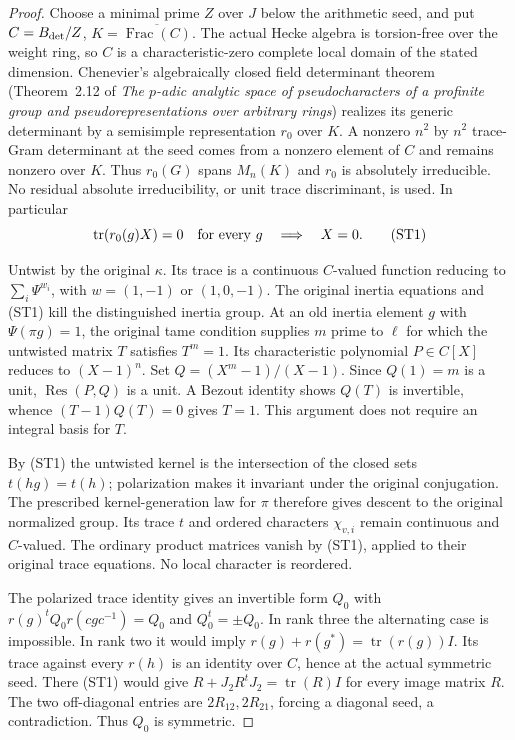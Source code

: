 \begin{proof}
Choose a minimal prime $Z$ over $J$ below the arithmetic seed, and put
$C=B_{\rm det}/Z$, $K=\overline{\operatorname{Frac}(C)}$. The actual
Hecke algebra is torsion-free over the weight ring, so $C$ is a
characteristic-zero complete local domain of the stated dimension.
Chenevier's algebraically closed field determinant theorem
(Theorem~2.12 of \emph{The $p$-adic analytic space of pseudocharacters
of a profinite group and pseudorepresentations over arbitrary rings})
realizes its generic determinant by a semisimple representation $r_0$
over $K$.\cite{support-chenevier}
A nonzero $n^2$ by $n^2$ trace-Gram determinant at the seed
comes from a nonzero element of $C$ and remains nonzero over $K$.
Thus $r_0(G)$ spans $M_n(K)$ and $r_0$ is absolutely irreducible.
No residual absolute irreducibility, or unit trace discriminant, is used.
In particular
\[
 \operatorname{tr}(r_0(g)X)=0\quad\hbox{for every }g
 \quad\Longrightarrow\quad X=0.                 \tag{ST1}
\]

Untwist by the original $\kappa$. Its trace is a continuous $C$-valued
function reducing to $\sum_i\Psi^{w_i}$, with
$w=(1,-1)$ or $(1,0,-1)$. The original inertia equations and (ST1)
kill the distinguished inertia group. At an old inertia element
$g$ with $\Psi(\pi g)=1$, the original tame condition supplies
$m$ prime to $\ell$ for which the untwisted matrix $T$ satisfies
$T^m=1$. Its characteristic polynomial $P\in C[X]$ reduces to
$(X-1)^n$. Set $Q=(X^m-1)/(X-1)$. Since $Q(1)=m$ is a unit,
$\operatorname{Res}(P,Q)$ is a unit. A Bezout identity shows
$Q(T)$ is invertible, whence $(T-1)Q(T)=0$ gives $T=1$.
This argument does not require an integral basis for $T$.

By (ST1) the untwisted kernel is the intersection of the closed sets
$t(hg)=t(h)$; polarization makes it invariant under the original
conjugation. The prescribed kernel-generation law for $\pi$ therefore
gives descent to the original normalized group. Its trace $t$ and
ordered characters $\chi_{v,i}$ remain continuous and $C$-valued.
The ordinary product matrices vanish by (ST1), applied to their
original trace equations. No local character is reordered.

The polarized trace identity gives an invertible form $Q_0$ with
$r(g)^tQ_0r(cgc^{-1})=Q_0$ and $Q_0^t=\pm Q_0$.
In rank three the alternating case is impossible. In rank two it
would imply $r(g)+r(g^*)=\operatorname{tr}(r(g))I$.
Its trace against every $r(h)$ is an identity over $C$, hence at the
actual symmetric seed. There (ST1) would give
$R+J_2R^tJ_2=\operatorname{tr}(R)I$ for every image matrix $R$.
The two off-diagonal entries are $2R_{12},2R_{21}$, forcing a
diagonal seed, a contradiction. Thus $Q_0$ is symmetric.


\end{proof}
